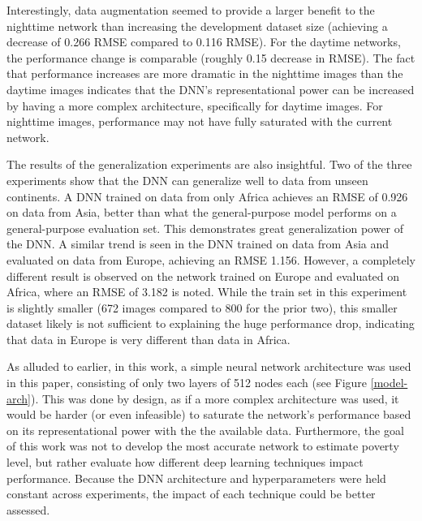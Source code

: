 \documentclass{article}
\begin{document}
Interestingly, data augmentation seemed to provide a larger benefit to the nighttime network than increasing the development dataset size (achieving a decrease of 0.266 RMSE compared to 0.116 RMSE). For the daytime networks, the performance change is comparable (roughly 0.15 decrease in RMSE). The fact that performance increases are more dramatic in the nighttime images than the daytime images indicates that the DNN's representational power can be increased by having a more complex architecture, specifically for daytime images. For nighttime images, performance may not have fully saturated with the current network. 

The results of the generalization experiments are also insightful. Two of the three experiments show that the DNN can generalize well to data from unseen continents. A DNN trained on data from only Africa achieves an RMSE of 0.926 on data from Asia, better than what the general-purpose model performs on a general-purpose evaluation set. This demonstrates great generalization power of the DNN. A similar trend is seen in the DNN trained on data from Asia and evaluated on data from Europe, achieving an RMSE 1.156. However, a completely different result is observed on the network trained on Europe and evaluated on Africa, where an RMSE of 3.182 is noted. While the train set in this experiment is slightly smaller (672 images compared to 800 for the prior two), this smaller dataset likely is not sufficient to explaining the huge performance drop, indicating that data in Europe is very different than data in Africa.

As alluded to earlier, in this work, a simple neural network architecture was used in this paper, consisting of only two layers of 512 nodes each (see Figure \ref{model-arch}). This was done by design, as if a more complex architecture was used,  it would be harder (or even infeasible) to saturate the network's performance based on its representational power with the the available data. Furthermore, the goal of this work was not to develop the most accurate network to estimate poverty level, but rather evaluate how  different deep learning techniques impact performance. Because the DNN architecture and hyperparameters were held constant across experiments, the impact of each technique could be better assessed.
\end{document}
